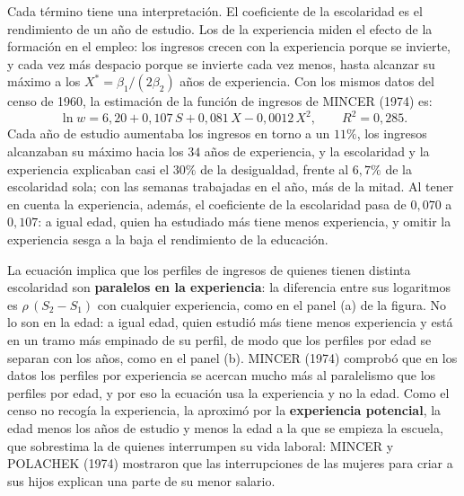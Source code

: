 \documentclass[10pt,a4paper]{article}
\begin{document}
Cada término tiene una interpretación. El coeficiente de la escolaridad es el rendimiento de un año de estudio. Los de la experiencia miden el efecto de la formación en el empleo: los ingresos crecen con la experiencia porque se invierte, y cada vez más despacio porque se invierte cada vez menos, hasta alcanzar su máximo a los $X^*=\beta_1/(2\beta_2)$ años de experiencia. Con los mismos datos del censo de 1960, la estimación de la función de ingresos de MINCER (1974) es:
$$\ln w=6{,}20+0{,}107\,S+0{,}081\,X-0{,}0012\,X^2,\qquad R^2=0{,}285.$$
Cada año de estudio aumentaba los ingresos en torno a un $11\%$, los ingresos alcanzaban su máximo hacia los $34$ años de experiencia, y la escolaridad y la experiencia explicaban casi el $30\%$ de la desigualdad, frente al $6{,}7\%$ de la escolaridad sola; con las semanas trabajadas en el año, más de la mitad. Al tener en cuenta la experiencia, además, el coeficiente de la escolaridad pasa de $0{,}070$ a $0{,}107$: a igual edad, quien ha estudiado más tiene menos experiencia, y omitir la experiencia sesga a la baja el rendimiento de la educación.

La ecuación implica que los perfiles de ingresos de quienes tienen distinta escolaridad son \textbf{paralelos en la experiencia}: la diferencia entre sus logaritmos es $\rho\,(S_2-S_1)$ con cualquier experiencia, como en el panel (a) de la figura. No lo son en la edad: a igual edad, quien estudió más tiene menos experiencia y está en un tramo más empinado de su perfil, de modo que los perfiles por edad se separan con los años, como en el panel (b). MINCER (1974) comprobó que en los datos los perfiles por experiencia se acercan mucho más al paralelismo que los perfiles por edad, y por eso la ecuación usa la experiencia y no la edad. Como el censo no recogía la experiencia, la aproximó por la \textbf{experiencia potencial}, la edad menos los años de estudio y menos la edad a la que se empieza la escuela, que sobrestima la de quienes interrumpen su vida laboral: MINCER y POLACHEK (1974) mostraron que las interrupciones de las mujeres para criar a sus hijos explican una parte de su menor salario.
\end{document}
